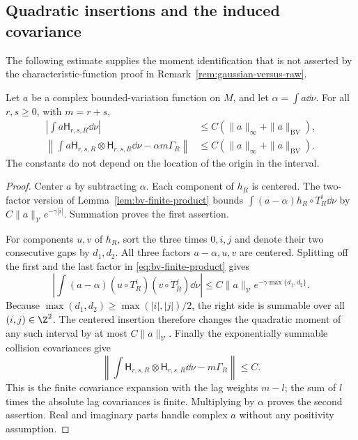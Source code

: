 \subsection{Quadratic insertions and the induced covariance}
The following estimate supplies the moment identification that is not
asserted by the characteristic-function proof in
Remark~\ref{rem:gaussian-versus-raw}.

\begin{lemma}
\label{lem:quadratic-collision-insertion}
Let $a$ be a complex bounded-variation function on $M$, and let
$\alpha=\int a\dd\nu$. For all $r,s\ge0$, with $m=r+s$,
\begin{align}
 \left|\int a\mathsf H_{r,s,R}\dd\nu\right|
       &\le C(\|a\|_\infty+\|a\|_{\mathrm{BV}}),
       \label{eq:linear-insertion-moment}\\
 \left\|\int a\mathsf H_{r,s,R}\otimes\mathsf H_{r,s,R}\dd\nu
                          -\alpha m\Gamma_R\right\|
       &\le C(\|a\|_\infty+\|a\|_{\mathrm{BV}}).
       \label{eq:quadratic-insertion-moment}
\end{align}
The constants do not depend on the location of the origin in the interval.
\end{lemma}
\begin{proof}
Center $a$ by subtracting $\alpha$. Each component of $h_R$ is
centered. The two-factor version of
Lemma~\ref{lem:bv-finite-product} bounds
$\int(a-\alpha)h_R\circ T_R^i\dd\nu$ by
$C\|a\|_{\mathcal V}e^{-\gamma|i|}$. Summation proves the first
assertion.

For components $u,v$ of $h_R$, sort the three times $0,i,j$ and
denote their two consecutive gaps by $d_1,d_2$. All three factors
$a-\alpha,u,v$ are centered. Splitting off the first and the last
factor in \eqref{eq:bv-finite-product} gives
\[
 \left|\int(a-\alpha)(u\circ T_R^i)(v\circ T_R^j)\dd\nu\right|
       \le C\|a\|_{\mathcal V}e^{-\gamma\max\{d_1,d_2\}}.
\]
Because $\max(d_1,d_2)\ge\max(|i|,|j|)/2$, the right side is
summable over all $(i,j)\in\Z^2$. The centered insertion therefore
changes the quadratic moment of any such interval by at most
$C\|a\|_{\mathcal V}$. Finally the exponentially summable collision
covariances give
\[
 \left\|\int\mathsf H_{r,s,R}\otimes\mathsf H_{r,s,R}\dd\nu
                                  -m\Gamma_R\right\|\le C.
\]
This is the finite covariance expansion with the lag weights $m-l$;
the sum of $l$ times the absolute lag covariances is finite. Multiplying
by $\alpha$ proves the second assertion. Real and imaginary parts
handle complex $a$ without any positivity assumption.
\end{proof}

